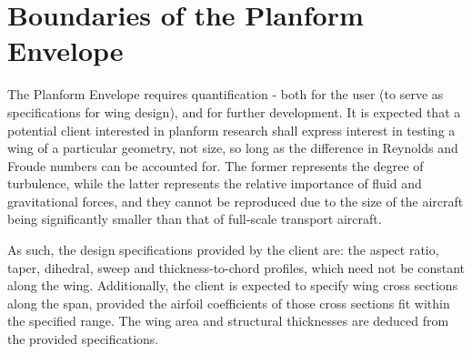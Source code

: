 

\section{Boundaries of the Planform Envelope}
\label{sec:Planform envelope boundaries}

The Planform Envelope requires quantification - both for the user (to serve as specifications for wing design), and for further development. It is expected that a potential client interested in planform research shall express interest in testing a wing of a particular geometry, not size, so long as the difference in Reynolds and Froude numbers can be accounted for. The former represents the degree of turbulence, while the latter represents the relative importance of fluid and gravitational forces, and they cannot be reproduced due to the size of the aircraft being significantly smaller than that of full-scale transport aircraft. 

As such, the design specifications provided by the client are: the aspect ratio, taper, dihedral, sweep and thickness-to-chord profiles, which need not be constant along the wing. Additionally, the client is expected to specify wing cross sections along the span, provided the airfoil coefficients of those cross sections fit within the specified range. The wing area and structural thicknesses are deduced from the provided specifications.


